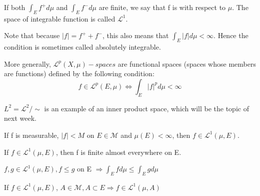 \documentclass[11pt]{scrartcl}
\begin{document}
\begin{definition}
If both $\int_E f^+ d\mu$ and $\int_E f^- d\mu$ are finite, we say that f is  with respect to $\mu$. The space of integrable function is called $\mathscr{L}^1$.
\end{definition}

\begin{remark}
Note that because $|f| = f^+ + f^-$, this also means that $\int_E |f| d\mu < \infty$. Hence the condition is sometimes called absolutely integrable.
\end{remark}

\begin{definition}
More generally, $\mathscr{L}^p(X,\mu)-spaces$ are functional spaces (spaces whose members are functions) defined by the following condition: $$f \in \mathscr{L}^p(E,\mu) \Leftrightarrow \int_E |f|^p d\mu < \infty$$
\end{definition}
\begin{remark}
$L^2 = \mathscr{L}^2/\sim$  is an example of an inner product space, which will be the topic of next week.
\end{remark}

\begin{exercise}
If f is measurable, $|f|<M$ on $E\in \mathcal{M}$ and $\mu(E)<\infty$, then $f\in \mathscr{L}^1(\mu,E)$.
\end{exercise}

\begin{exercise}
If $f \in \mathscr{L}^1(\mu,E)$, then f is finite almost everywhere on E.
\end{exercise}

\begin{exercise}
$f,g \in \mathscr{L}^1(\mu,E), f\leq g $ on E $\Rightarrow \int_E f d\mu \le \int_E g d\mu $ 
\end{exercise}

\begin{exercise}
If $f \in \mathscr{L}^1(\mu,E)$, $A\in \mathcal{M}, A\subset E \Rightarrow f\in \mathscr{L}^1(\mu,A)$
\end{exercise}
\end{document}
